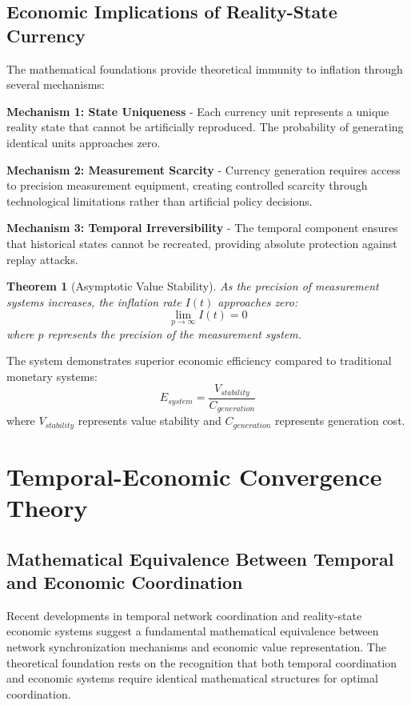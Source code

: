 \documentclass[12pt,a4paper]{article}
\newtheorem{theorem}{Theorem}
\begin{document}
\subsection{Economic Implications of Reality-State Currency}

The mathematical foundations provide theoretical immunity to inflation through several mechanisms:

\textbf{Mechanism 1: State Uniqueness} - Each currency unit represents a unique reality state that cannot be artificially reproduced. The probability of generating identical units approaches zero.

\textbf{Mechanism 2: Measurement Scarcity} - Currency generation requires access to precision measurement equipment, creating controlled scarcity through technological limitations rather than artificial policy decisions.

\textbf{Mechanism 3: Temporal Irreversibility} - The temporal component ensures that historical states cannot be recreated, providing absolute protection against replay attacks.

\begin{theorem}[Asymptotic Value Stability]
As the precision of measurement systems increases, the inflation rate $I(t)$ approaches zero:
\begin{equation}
\lim_{p \to \infty} I(t) = 0
\end{equation}
where $p$ represents the precision of the measurement system.
\end{theorem}

The system demonstrates superior economic efficiency compared to traditional monetary systems:
\begin{equation}
E_{system} = \frac{V_{stability}}{C_{generation}}
\end{equation}
where $V_{stability}$ represents value stability and $C_{generation}$ represents generation cost.

\section{Temporal-Economic Convergence Theory}

\subsection{Mathematical Equivalence Between Temporal and Economic Coordination}

Recent developments in temporal network coordination and reality-state economic systems suggest a fundamental mathematical equivalence between network synchronization mechanisms and economic value representation. The theoretical foundation rests on the recognition that both temporal coordination and economic systems require identical mathematical structures for optimal coordination.
\end{document}
